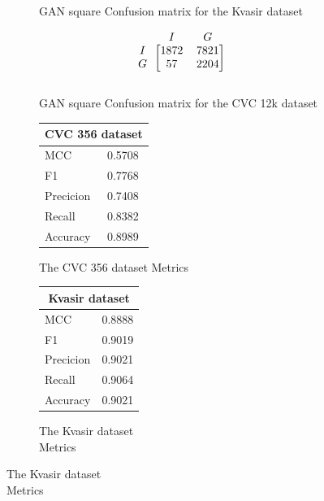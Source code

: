 \begin{figure}[h]
\begin{subfigure}[b]{0.49\textwidth}
        
\caption{GAN square Confusion matrix for the Kvasir dataset}
\label{mat:kvasir_CM_IRV2_GAN_SQUARE}
\end{subfigure}
\begin{subfigure}[b]{0.25\textwidth}
        \[
\begin{blockarray}{ccc}
& I & G  \\
\begin{block}{c[cc]}
 		I&1872 & 7821\\
        G&57  & 2204\\
\end{block}
\end{blockarray}
\]   
\caption{GAN square Confusion matrix for the CVC 12k dataset}
\label{mat:cvc12k_CM_IRV2_GAN_SQUARE}
\end{subfigure}
\caption{Confusion matrices for the three datasets}
\label{mat:CM_IRV2_GAN_SQUARE}
\begin{subfigure}[b]{0.25\textwidth}
\begin{tabular}{ll}      
        \toprule
        \multicolumn{2}{c}{CVC 356 dataset}        \\
        \midrule
        MCC 		& 0.5708 \\
        F1  		& 0.7768 \\
        Precicion  	& 0.7408 \\
        Recall     	& 0.8382 \\
        Accuracy	& 0.8989 \\
        \bottomrule
        \end{tabular}
\caption{The CVC 356 dataset Metrics}
\label{tab:cvc356_metrics_IRV2_GAN_SQUARE}
\end{subfigure}%
\begin{subfigure}[b]{0.49\textwidth}
    	\centering
        \begin{tabular}{ll}
        \toprule
        \multicolumn{2}{c}{Kvasir dataset}        \\
        \midrule
        MCC 		& 0.8888 \\
        F1  		& 0.9019 \\
        Precicion  	& 0.9021 \\
        Recall     	& 0.9064 \\
        Accuracy	& 0.9021 \\
        \bottomrule
\end{tabular}
\caption{The Kvasir dataset\\ Metrics}
\label{tab:kvasir_metrics_IRV2_GAN_SQUARE}
\end{subfigure}%

\end{figure}
